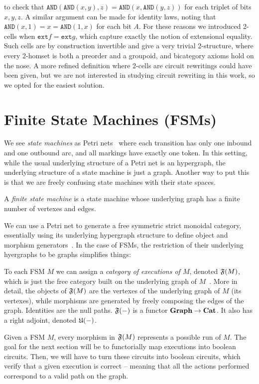 \documentclass[preliminary,copyright,creativecommons,sharealike,noncommercial]{eptcs}
\begin{document}
to check that 
$\texttt{AND}(\texttt{AND}(x,y),z) = \texttt{AND}(x,\texttt{AND}(y,z))$
for each triplet of bits $x, y, z$. A similar argument can be made for identity 
laws, noting that $\texttt{AND}(x, 1) = x = \texttt{AND}(1,x)$ for each 
bit $A$. For these reasons we introduced 
2-cells when $\texttt{ext}f = \texttt{ext}g$, which capture exactly 
the notion of extensional equality. Such cells are by construction invertible 
and give a very trivial 2-structure, where every 2-homset is both 
a preorder and a groupoid, and bicategory axioms hold on the nose.
A more refined definition 
where 2-cells are circuit rewritings could have been given, 
but we are not interested in studying circuit rewriting in this 
work, so we opted for the easiest solution.
%
%
%
\section{Finite State Machines (FSMs)}\label{sec: finite state machines}
We see \emph{state machines} as Petri nets~\cite[Ch.2]{StateboxTeam2019a} where 
each transition has only one inbound and one outbound arc, 
and all markings have exactly one token. In this setting, while 
the usual underlying structure of a Petri net is an hypergraph,
the underlying structure of a state machine is just 
a graph. Another way to put this is that we are freely 
confusing state machines with their state spaces.
%
%
\begin{definition}
  A \emph{finite state machine} is a state machine whose
  underlying graph has a finite number of vertexes and edges.
\end{definition}
%
We can use a Petri net to generate a free symmetric strict monoidal 
category, essentially using its underlying hypergraph structure to define 
object and morphism generators~\cite{Genovese2019}. In the case of FSMs, the restriction 
of their underlying hyergraphs to be graphs simplifies things:
%
%
\begin{definition}
  To each FSM $M$ we can assign a \emph{category of executions 
  of $M$}, denoted $\mathfrak{F}(M)$, which is just the free category built 
  on the underlying graph of $M$~\cite[pp.49-51]{MacLane1978}. More in detail, the objects of $\mathfrak{F}(M)$
  are the vertexes of the underlying graph of $M$ (its vertexes), while morphisms 
  are generated by freely composing the edges of the graph. 
  Identities are the null paths. $\mathfrak{F}(-)$ is a functor $\textbf{Graph} \to \textbf{Cat}$. 
  It also has a right adjoint, denoted $\mathfrak{U}(-)$.
\end{definition}
%
Given a FSM $M$, every morphism in $\mathfrak{F}(M)$ represents a possible 
run of $M$. The goal for the next section will be to functorially map 
executions into boolean circuits. Then, we will have to turn 
these circuits into boolean circuits, which verify that a given 
execution is correct -- meaning that all the actions performed correspond to a valid path
on the graph. 
%
%
\end{document}
